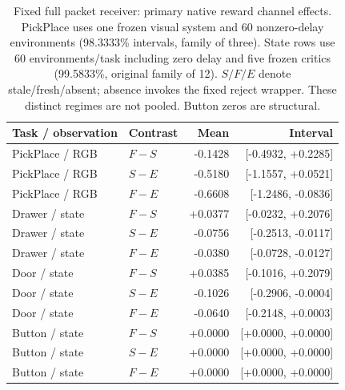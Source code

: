 \documentclass[10pt,a4paper]{article}
\begin{document}
\setcounter{table}{4}
\begin{table}[H]\centering\small
\caption{Fixed full packet receiver: primary native reward channel effects. PickPlace uses one frozen visual system and 60 nonzero-delay environments (98.3333\% intervals, family of three). State rows use 60 environments/task including zero delay and five frozen critics (99.5833\%, original family of 12). $S/F/E$ denote stale/fresh/absent; absence invokes the fixed reject wrapper. These distinct regimes are not pooled. Button zeros are structural.}
\setlength{\tabcolsep}{4pt}\begin{tabular}{llrr}\toprule Task / observation & Contrast & Mean & Interval\\\midrule
PickPlace / RGB & $F-S$ & -0.1428 & [-0.4932, +0.2285]\\
PickPlace / RGB & $S-E$ & -0.5180 & [-1.1557, +0.0521]\\
PickPlace / RGB & $F-E$ & -0.6608 & [-1.2486, -0.0836]\\
Drawer / state & $F-S$ & +0.0377 & [-0.0232, +0.2076]\\
Drawer / state & $S-E$ & -0.0756 & [-0.2513, -0.0117]\\
Drawer / state & $F-E$ & -0.0380 & [-0.0728, -0.0127]\\
Door / state & $F-S$ & +0.0385 & [-0.1016, +0.2079]\\
Door / state & $S-E$ & -0.1026 & [-0.2906, -0.0004]\\
Door / state & $F-E$ & -0.0640 & [-0.2148, +0.0003]\\
Button / state & $F-S$ & +0.0000 & [+0.0000, +0.0000]\\
Button / state & $S-E$ & +0.0000 & [+0.0000, +0.0000]\\
Button / state & $F-E$ & +0.0000 & [+0.0000, +0.0000]\\
\bottomrule\end{tabular}\end{table}
\end{document}
